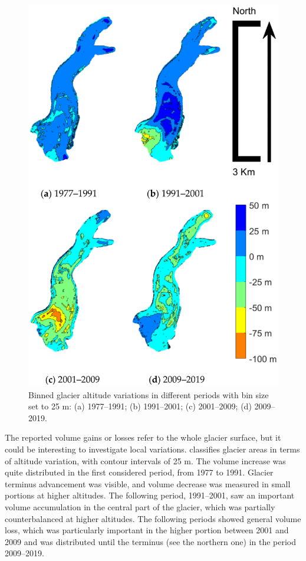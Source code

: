 \begin{figure}
    \centering
    \includegraphics[height=0.90\textheight]{results_volumes_variations.png}
    \caption{Binned glacier altitude variations in different periods with bin size set to 25 m: (a) 1977–1991; (b) 1991–2001; (c) 2001–2009; (d) 2009–2019. }
    \label{fig:2:volume_variations}
\end{figure}

The reported volume gains or losses refer to the whole glacier surface, but it could be interesting to investigate local variations. 
 classifies glacier areas in terms of altitude variation, with contour intervals of 25 m. 
The volume increase was quite distributed in the first considered period, from 1977 to 1991. 
Glacier terminus advancement was visible, and volume decrease was measured in small portions at higher altitudes. 
The following period, 1991–2001, saw an important volume accumulation in the central part of the glacier, which was partially counterbalanced at higher altitudes. 
The following periods showed general volume loss, which was particularly important in the higher portion between 2001 and 2009 and was distributed until the terminus (see the northern one) in the period 2009–2019.

